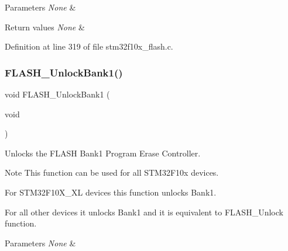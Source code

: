 \begin{DoxyParams}{Parameters}
{\em None} & \\
\hline
\end{DoxyParams}

\begin{DoxyRetVals}{Return values}
{\em None} & \\
\hline
\end{DoxyRetVals}


Definition at line 319 of file stm32f10x\+\_\+flash.\+c.

\mbox{\label{group___f_l_a_s_h___exported___functions_ga358c4b7e0ef20693ca62cc9d20c94a5a}} 
\subsubsection{\texorpdfstring{F\+L\+A\+S\+H\+\_\+\+Unlock\+Bank1()}{FLASH\_UnlockBank1()}}
{\footnotesize\ttfamily void F\+L\+A\+S\+H\+\_\+\+Unlock\+Bank1 (\begin{DoxyParamCaption}\item[{void}]{ }\end{DoxyParamCaption})}



Unlocks the F\+L\+A\+SH Bank1 Program Erase Controller. 

\begin{DoxyNote}{Note}
This function can be used for all S\+T\+M32\+F10x devices.
\begin{DoxyItemize}
\item For S\+T\+M32\+F10\+X\+\_\+\+XL devices this function unlocks Bank1.
\item For all other devices it unlocks Bank1 and it is equivalent to F\+L\+A\+S\+H\+\_\+\+Unlock function. 
\end{DoxyItemize}
\end{DoxyNote}

\begin{DoxyParams}{Parameters}
{\em None} & \\
\hline
\end{DoxyParams}

